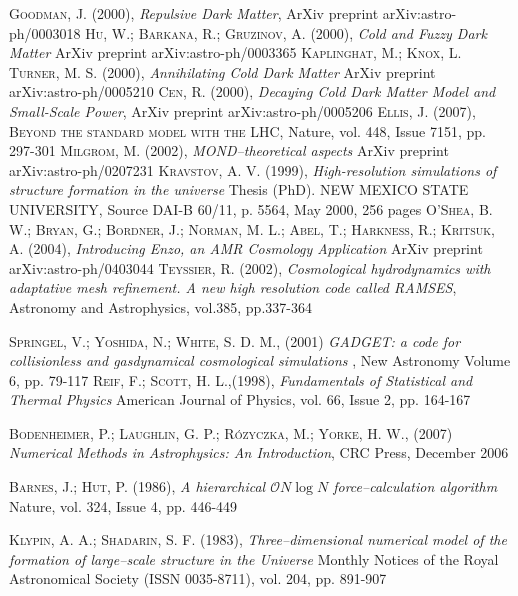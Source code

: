 \documentclass[a4paper,openright,10pt, oneside, final]{book}
\begin{document}
\begin{thebibliography}{a}
 
 \textsc{Goodman, J. (2000)},
\textit{Repulsive Dark Matter},
ArXiv preprint arXiv:astro-ph/0003018
 \textsc{Hu, W.; Barkana, R.; Gruzinov, A. (2000)},
\textit{Cold and Fuzzy Dark Matter}
ArXiv preprint arXiv:astro-ph/0003365
 \textsc{Kaplinghat, M.; Knox, L. Turner, M. S. (2000)},
\textit{Annihilating Cold Dark Matter}
ArXiv preprint arXiv:astro-ph/0005210
 \textsc{Cen, R. (2000)},
\textit{Decaying Cold Dark Matter Model and Small-Scale Power},
ArXiv preprint arXiv:astro-ph/0005206
 \textsc{Ellis, J. (2007)},
\textsc{Beyond the standard model with the LHC},
Nature, vol. 448, Issue 7151, pp. 297-301
 \textsc{Milgrom, M. (2002)},
\textit{MOND--theoretical aspects}
ArXiv preprint arXiv:astro-ph/0207231
 \textsc{Kravstov, A. V. (1999)},
\textit{High-resolution simulations of structure formation in the universe}
Thesis (PhD). NEW MEXICO STATE UNIVERSITY, Source DAI-B 60/11, p. 5564, May 2000, 256 pages
 \textsc{O'Shea, B. W.; Bryan, G.; Bordner, J.; Norman, M. L.; Abel, T.; Harkness, R.; Kritsuk, A. (2004)},
\textit{Introducing Enzo, an AMR Cosmology Application}
ArXiv preprint arXiv:astro-ph/0403044
 \textsc{Teyssier, R. (2002)},
\textit{Cosmological hydrodynamics with adaptative mesh refinement. A new high resolution code called RAMSES},
Astronomy and Astrophysics, vol.385, pp.337-364

 \textsc{Springel, V.; Yoshida, N.; White, S. D. M., (2001)}
\textit{GADGET: a code for collisionless and gasdynamical cosmological simulations },
New Astronomy Volume 6, pp. 79-117
 \textsc{Reif, F.; Scott, H. L.,(1998)},
\textit{Fundamentals of Statistical and Thermal Physics}
American Journal of Physics, vol. 66, Issue 2, pp. 164-167

 \textsc{Bodenheimer, P.; Laughlin, G. P.; Rózyczka, M.; Yorke, H. W., (2007)} 
\textit{Numerical Methods in Astrophysics: An Introduction},
CRC Press, December 2006

 \textsc{Barnes, J.; Hut, P. (1986)},
\textit{A hierarchical $\mathcal{O}N\log N$ force--calculation algorithm}
Nature, vol. 324, Issue 4, pp. 446-449

 \textsc{Klypin, A. A.; Shadarin, S. F. (1983)},
\textit{Three--dimensional numerical model of the formation of large--scale structure in the Universe}
Monthly Notices of the Royal Astronomical Society (ISSN 0035-8711), vol. 204, pp. 891-907


\end{thebibliography}
\end{document}
